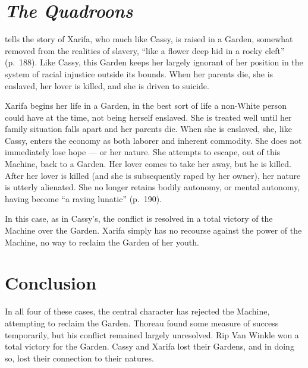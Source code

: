 \documentclass[man,12pt,natbib]{apa6}
\begin{document}
\section{\emph{The Quadroons}}

\citet{Child12} tells the story of Xarifa, who much like Cassy, is raised in a
Garden, somewhat removed from the realities of slavery, ``like a flower deep
hid in a rocky cleft'' (p.~188). Like Cassy, this Garden keeps her largely
ignorant of her position in the system of racial injustice outside its bounds.
When her parents die, she is enslaved, her lover is killed, and she is driven
to suicide.

Xarifa begins her life in a Garden, in the best sort of life a non-White person
could have at the time, not being herself enslaved. She is treated well until
her family situation falls apart and her parents die. When she is enslaved,
she, like Cassy, enters the economy as both laborer and inherent commodity. She
does not immediately lose hope --- or her nature.  She attempts to escape, out
of this Machine, back to a Garden. Her lover comes to take her away, but he is
killed. After her lover is killed (and she is subsequently raped by her owner),
her nature is utterly alienated. She no longer retains bodily autonomy, or
mental autonomy, having become ``a raving lunatic'' (p.~190).

In this case, as in Cassy's, the conflict is resolved in a total victory of the
Machine over the Garden. Xarifa simply has no recourse against the power of the
Machine, no way to reclaim the Garden of her youth.



\section{Conclusion}


In all four of these cases, the central character has rejected the Machine,
attempting to reclaim the Garden. Thoreau found some measure of success 
temporarily, but his conflict remained largely unresolved. Rip Van Winkle 
won a total victory for the Garden. Cassy and Xarifa lost their Gardens, 
and in doing so, lost their connection to their natures.


\clearpage

\end{document}
